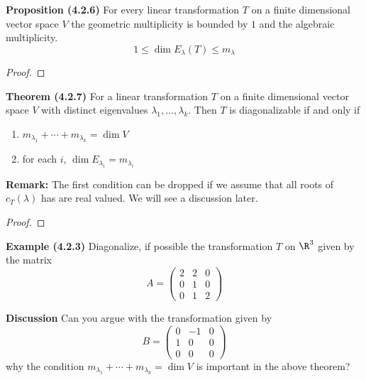 \documentclass[letterpaper, 10pt]{article}
\begin{document}
\newpage
\lb
\textbf{Proposition (4.2.6)}
\lb
For every linear transformation $T$ on a finite dimensional vector space $V$ the geometric 
multiplicity is bounded by $1$ and the algebraic multiplicity.
\[ 1 \leq \dim{E_λ}(T) \leq m_λ \]
\begin{proof}
\end{proof}

\vspace{200pt}
\lb
\textbf{Theorem (4.2.7)}
\lb
For a linear transformation $T$ on a finite dimensional vector space $V$
with distinct eigenvalues $λ_1, \ldots, λ_k$.
Then $T$ is diagonalizable if and only if
\begin{enumerate}
    \item $m_{λ_1} + \cdots + m_{λ_k} = \dim{V}$
    \item for each $i$, $\dim{E_{λ_i}} = m_{λ_i}$
\end{enumerate}
\textbf{Remark:} The first condition can be dropped if we assume that all roots of $c_T(λ)$ has
are real valued. We will see a discussion later.
\begin{proof}
\end{proof}


\newpage
\lb
\textbf{Example (4.2.3)}
\lb
Diagonalize, if possible the transformation $T$ on $\R^3$ given by the matrix
\[ A = \begin{pmatrix}
    2 & 2 & 0 \\
    0 & 1 & 0 \\
    0 & 1 & 2
\end{pmatrix}
\]




\vspace{300pt}
\lb
\textbf{Discussion}
\lb
Can you argue with the transformation given by
\[ B = \begin{pmatrix}
    0 & -1 & 0 \\
    1 & 0 & 0 \\
    0 & 0 & 0
\end{pmatrix}
\]
why the condition $m_{λ_1} + \cdots + m_{λ_k} = \dim{V}$ is important in the above theorem?
\end{document}
